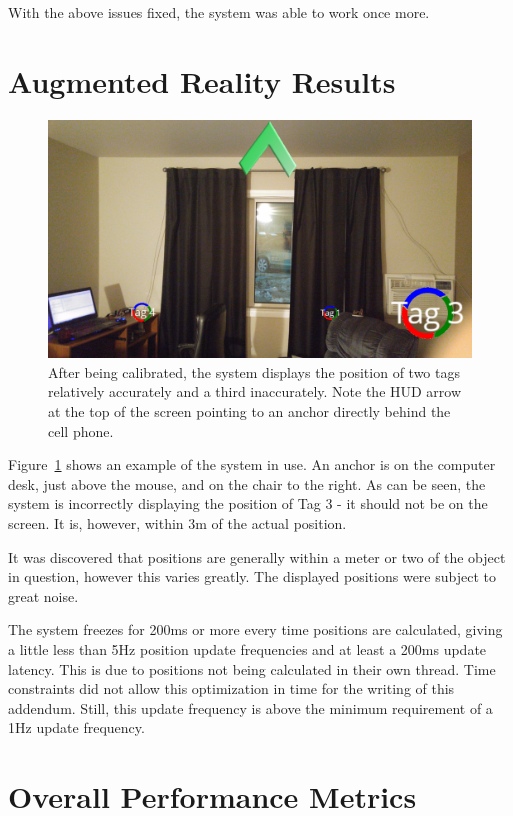 With the above issues fixed, the system was able to work once more.

\section{Augmented Reality Results}
\begin{figure}
	\centering
	\includegraphics[width=\linewidth]{Figures/AR1.png}
	\decoRule
	\caption{After being calibrated, the system displays the position of two tags relatively accurately and a third inaccurately. Note the HUD arrow at the top of the screen pointing to an anchor directly behind the cell phone.}
	\label{fig:AR1}
\end{figure}

Figure~\ref{fig:AR1} shows an example of the system in use. An anchor is on the computer desk, just above the mouse, and on the chair to the right. As can be seen, the system is incorrectly displaying the position of Tag 3 - it should not be on the screen. It is, however, within 3m of the actual position.

It was discovered that positions are generally within a meter or two of the object in question, however this varies greatly. The displayed positions were subject to great noise.

The system freezes for 200ms or more every time positions are calculated, giving a little less than 5Hz position update frequencies and at least a 200ms update latency. This is due to positions not being calculated in their own thread. Time constraints did not allow this optimization in time for the writing of this addendum. Still, this update frequency is above the minimum requirement of a 1Hz update frequency.

\section{Overall Performance Metrics}

